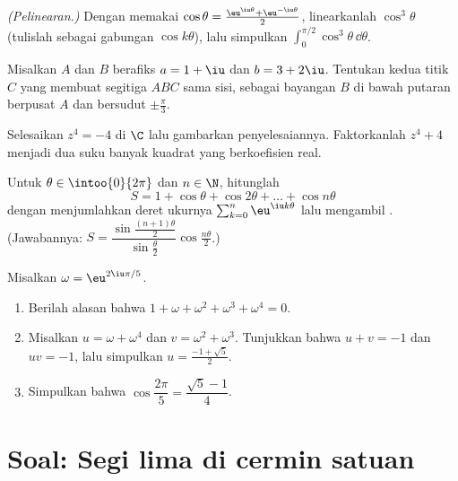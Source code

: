 \begin{exercise}[$\star\star$]\label{exo:g12:complex:6}
\emph{(Pelinearan.)} Dengan memakai
$\cos\theta = \frac{\eu^{\iu\theta} + \eu^{-\iu\theta}}{2}$, linearkanlah
$\cos^3\theta$ (tulislah sebagai gabungan $\cos k\theta$), lalu simpulkan
$\displaystyle\int_0^{\pi/2}\cos^3\theta\,\dd\theta$.
\end{exercise}

\begin{exercise}[$\star\star$]\label{exo:g12:complex:7}
Misalkan $A$ dan $B$ berafiks $a = 1 + \iu$ dan $b = 3 + 2\iu$. Tentukan kedua
titik $C$ yang membuat segitiga $ABC$ sama sisi, sebagai bayangan $B$
di bawah putaran berpusat $A$ dan bersudut $\pm\frac{\pi}{3}$.
\end{exercise}

\begin{exercise}[$\star\star\star$]\label{exo:g12:complex:8}
Selesaikan $z^4 = -4$ di $\C$ lalu gambarkan penyelesaiannya. Faktorkanlah
$z^4 + 4$ menjadi dua suku banyak kuadrat yang berkoefisien real.
\end{exercise}

\begin{exercise}[$\star\star\star$]\label{exo:g12:complex:9}
Untuk $\theta \in \intoo{0}{2\pi}$ dan $n \in \N$, hitunglah
\[
S = 1 + \cos\theta + \cos 2\theta + \dots + \cos n\theta
\]
dengan menjumlahkan deret ukurnya
$\sum_{k=0}^n \eu^{\iu k\theta}$ lalu mengambil . (Jawabannya:
$S = \dfrac{\sin\frac{(n+1)\theta}{2}}{\sin\frac{\theta}{2}}
\cos\frac{n\theta}{2}$.)
\end{exercise}

\begin{exercise}[$\star\star\star$]\label{exo:g12:complex:10}
Misalkan $\omega = \eu^{2\iu\pi/5}$.
\begin{enumerate}
  \item Berilah alasan bahwa $1 + \omega + \omega^2 + \omega^3 + \omega^4 = 0$.
  \item Misalkan $u = \omega + \omega^4$ dan $v = \omega^2 + \omega^3$. Tunjukkan
        bahwa $u + v = -1$ dan $uv = -1$, lalu simpulkan $u = \frac{-1+\sqrt5}{2}$.
  \item Simpulkan bahwa $\cos\dfrac{2\pi}{5} = \dfrac{\sqrt5 - 1}{4}$.
\end{enumerate}
\end{exercise}

\section{Soal: Segi lima di cermin satuan}

